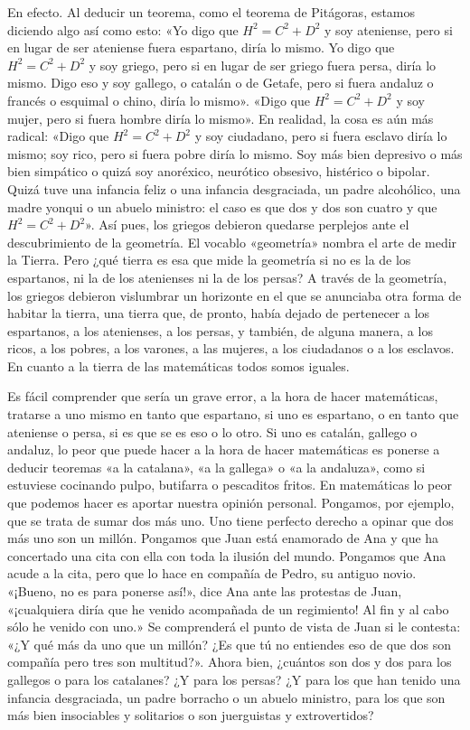 \documentclass[draft,9pt,letterpaper,twocolumn,openany]{extbook}
\newcommand{\notar}[1]{\marginnote{\small\sffamily #1}[-.8em]}
\begin{document}
En efecto. Al deducir un teorema, como el teorema de
Pitágoras, estamos diciendo algo así como esto: «Yo
digo que $H^2=C^2+D^2$ y soy ateniense, pero si en lugar de ser
ateniense fuera espartano, diría lo mismo. Yo digo que
$H^2=C^2+D^2$ y soy griego, pero si en lugar de ser griego fuera
persa, diría lo mismo. Digo eso y soy gallego, o catalán o
de Getafe, pero si fuera andaluz o francés o esquimal o
chino, diría lo mismo». «Digo que $H^2=C^2+D^2$ y soy mujer, pero
si fuera hombre diría lo mismo». En realidad, la cosa es aún
más radical: «Digo que $H^2=C^2+D^2$ y soy ciudadano, pero si
fuera esclavo diría lo mismo; soy rico, pero si fuera pobre
diría lo mismo. Soy más bien depresivo o más bien
simpático o quizá soy anoréxico, neurótico obsesivo,
histérico o bipolar. Quizá tuve una infancia feliz o una
infancia desgraciada, un padre alcohólico, una madre yonqui
o un abuelo ministro: el caso es que dos y dos son cuatro y
que $H^2=C^2+D^2$». Así pues, los griegos debieron quedarse
perplejos ante el descubrimiento de la geometría. El vocablo
«geometría» nombra el arte de medir la Tierra. Pero ¿qué
tierra es esa que mide la geometría si no es la de los
espartanos, ni la de los atenienses ni la de los persas? A
través de la geometría, los griegos debieron vislumbrar un
horizonte en el que se anunciaba otra forma de habitar la
tierra, una tierra que, de pronto, había dejado de pertenecer
a los espartanos, a los atenienses, a los persas, y también,
de alguna manera, a los ricos, a los pobres, a los varones,
a las mujeres, a los ciudadanos o a los esclavos. En cuanto
a la tierra de las matemáticas todos somos iguales.


Es fácil comprender que sería un grave error, a la hora de
hacer matemáticas, tratarse a uno mismo en tanto que
espartano, si uno es espartano, o en tanto que ateniense o
persa, si es que se es eso o lo otro. Si uno es catalán,
gallego o andaluz, lo peor que puede hacer a la hora de
hacer matemáticas es ponerse a deducir teoremas «a la
catalana», «a la gallega» o «a la andaluza», como si
estuviese cocinando pulpo, butifarra o pescaditos fritos. En
matemáticas lo peor que podemos hacer es aportar nuestra
opinión personal. Pongamos, por ejemplo, que se trata de
sumar dos más uno. Uno tiene perfecto derecho a opinar
que dos más uno son un millón. Pongamos que Juan está
enamorado de Ana y que ha concertado una cita con ella
con toda la ilusión del mundo. Pongamos que Ana acude a
la cita, pero que lo hace en compañía de Pedro, su antiguo
novio. «¡Bueno, no es para ponerse así!», dice Ana ante las
protestas de Juan, «¡cualquiera diría que he venido
acompañada de un regimiento! Al fin y al cabo sólo he
venido con uno.» Se comprenderá el punto de vista de Juan
si le contesta: «¿Y qué más da uno que un millón? ¿Es que
tú no entiendes eso de que dos son compañía pero tres
son multitud?». Ahora bien, ¿cuántos son dos y dos para
los gallegos o para los catalanes? ¿Y para los persas? ¿Y
para los que han tenido una infancia desgraciada, un
padre borracho o un abuelo ministro, para los que son
más bien insociables y solitarios o son juerguistas y
extrovertidos?
\end{document}
